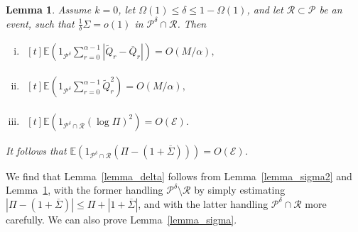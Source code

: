 \documentclass{article}
\theoremstyle{plain}
\theoremstyle{remark}
\theoremstyle{plain}
\newtheorem{lemma}[theorem]{Lemma}
\numberwithin{equation}{section}
\begin{document}
	\begin{lemma}\label{lemma_error}
		Assume $k=0$, let $\Omega(1)\leq\delta\leq1-\Omega(1)$, and let $\mathcal{R}\subset\mathcal{P}$ be an event, such that $\tfrac1{\delta}\Sigma=o(1)$ in $\mathcal{P}^{\delta}\cap\mathcal{R}$. Then
		\begin{enumerate}[(i)]
			\item\label{lemma_error_diff} $\begin{aligned}[t]
				\mathbb{E}\left(1_{\mathcal{P}^{\delta}}\sum_{r=0}^{\alpha-1}|\widetilde{Q}_r-\overline{Q}_r|\right)=O(M/\alpha),
			\end{aligned}$
			\item\label{lemma_error_sum} $\begin{aligned}[t]
				\mathbb{E}\left(1_{\mathcal{P}^{\delta}}\sum_{r=0}^{\alpha-1}\widetilde{Q}_r^2\right)=O(M/\alpha),
			\end{aligned}$
			\item\label{lemma_error_log} $\begin{aligned}[t]
				\mathbb{E}(1_{\mathcal{P}^{\delta}\cap\mathcal{R}}(\log\Pi)^2)=O(\mathscr{E}).
			\end{aligned}$
		\end{enumerate}
		It follows that $\mathbb{E}(1_{\mathcal{P}^{\delta}\cap\mathcal{R}}(\Pi-(1+\overline{\Sigma})))=O(\mathscr{E})$.
	\end{lemma}
	
	We find that Lemma~\ref{lemma_delta} follows from Lemma~\ref{lemma_sigma2} and Lemma~\ref{lemma_error}, with the former handling $\mathcal{P}^{\delta}\setminus\mathcal{R}$ by simply estimating $|\Pi-(1+\overline{\Sigma})|\leq\Pi+|1+\overline{\Sigma}|$, and with the latter handling $\mathcal{P}^{\delta}\cap\mathcal{R}$ more carefully. We can also prove Lemma~\ref{lemma_sigma}.
	
\end{document}

